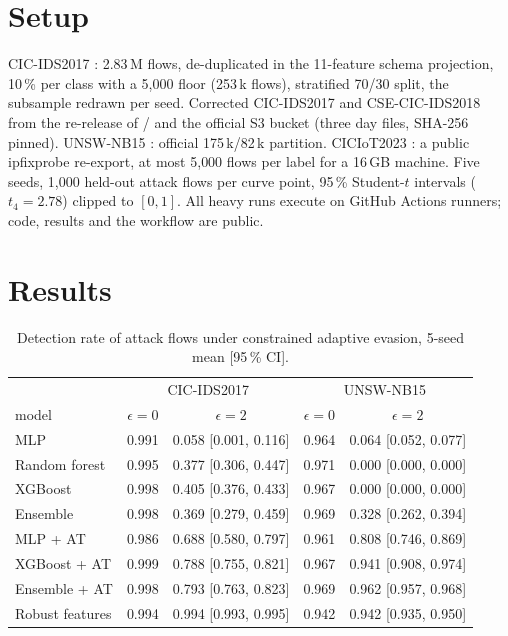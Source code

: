 \documentclass[11pt]{article}
\begin{document}
\section{Setup}
CIC-IDS2017 \cite{sharafaldin2018}: 2.83\,M flows, de-duplicated in the 11-feature schema
projection, 10\,\% per class with a 5{,}000 floor (253\,k flows), stratified 70/30 split, the
subsample redrawn per seed. Corrected CIC-IDS2017 and CSE-CIC-IDS2018 from the re-release of
\cite{liu2022}/\cite{engelen2021} and the official S3 bucket (three day files, SHA-256 pinned).
UNSW-NB15 \cite{moustafa2015}: official 175\,k/82\,k partition. CICIoT2023 \cite{neto2023}: a
public ipfixprobe re-export, at most 5{,}000 flows per label for a 16\,GB machine. Five seeds,
1{,}000 held-out attack flows per curve point, 95\,\% Student-$t$ intervals ($t_4=2.78$) clipped
to $[0,1]$. All heavy runs execute on GitHub Actions runners; code, results and the workflow are
public.

\section{Results}
\begin{table}[h]\centering\small
\begin{tabular}{lcccc}\toprule
& \multicolumn{2}{c}{CIC-IDS2017} & \multicolumn{2}{c}{UNSW-NB15}\\
model & $\epsilon=0$ & $\epsilon=2$ & $\epsilon=0$ & $\epsilon=2$\\\midrule
MLP & 0.991 & 0.058 [0.001, 0.116] & 0.964 & 0.064 [0.052, 0.077]\\
Random forest & 0.995 & 0.377 [0.306, 0.447] & 0.971 & 0.000 [0.000, 0.000]\\
XGBoost & 0.998 & 0.405 [0.376, 0.433] & 0.967 & 0.000 [0.000, 0.000]\\
Ensemble & 0.998 & 0.369 [0.279, 0.459] & 0.969 & 0.328 [0.262, 0.394]\\
MLP + AT & 0.986 & 0.688 [0.580, 0.797] & 0.961 & 0.808 [0.746, 0.869]\\
XGBoost + AT & 0.999 & 0.788 [0.755, 0.821] & 0.967 & 0.941 [0.908, 0.974]\\
Ensemble + AT & 0.998 & 0.793 [0.763, 0.823] & 0.969 & 0.962 [0.957, 0.968]\\
Robust features & 0.994 & 0.994 [0.993, 0.995] & 0.942 & 0.942 [0.935, 0.950]\\\bottomrule
\end{tabular}
\caption{Detection rate of attack flows under constrained adaptive evasion, 5-seed mean [95\,\% CI].}
\end{table}
\end{document}
